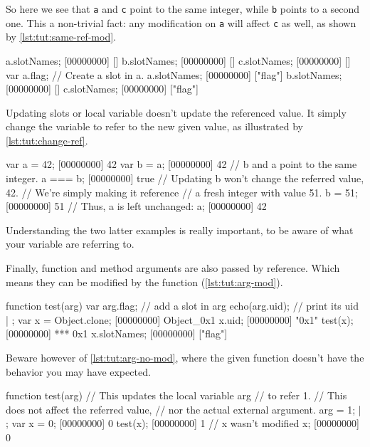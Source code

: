 So here we see that \lstinline|a| and \lstinline|c| point to the same
integer, while \lstinline|b| points to a second one. This a
non-trivial fact: any modification on \lstinline|a| will affect
\lstinline|c| as well, as shown by \autoref{lst:tut:same-ref-mod}.

\begin{urbiscript}[caption=Shared modification,
  label=lst:tut:same-ref-mod, name=same]
a.slotNames;
[00000000] []
b.slotNames;
[00000000] []
c.slotNames;
[00000000] []
var a.flag; // Create a slot in a.
a.slotNames;
[00000000] ["flag"]
b.slotNames;
[00000000] []
c.slotNames;
[00000000] ["flag"]
\end{urbiscript}

Updating slots or local variable doesn't update the referenced
value. It simply change the variable to refer to the new given value,
as illustrated by \autoref{lst:tut:change-ref}.

\begin{urbiscript}[caption=Updates just change the referee,
  label=lst:tut:change-ref]
var a = 42;
[00000000] 42
var b = a;
[00000000] 42
// b and a point to the same integer.
a === b;
[00000000] true
// Updating b won't change the referred value, 42.
// We're simply making it reference
// a fresh integer with value 51.
b = 51;
[00000000] 51
// Thus, a is left unchanged:
a;
[00000000] 42
\end{urbiscript}

Understanding the two latter examples is really important, to be aware
of what your variable are referring to.

Finally, function and method arguments are also passed by
reference. Which means they can be modified by the function
(\autoref{lst:tut:arg-mod}).

\begin{urbiscript}[caption=Function modifying its argument,
label=lst:tut:arg-mod]
function test(arg)
{
  var arg.flag;  // add a slot in arg
  echo(arg.uid); // print its uid
} | {};
var x = Object.clone;
[00000000] Object_0x1
x.uid;
[00000000] "0x1"
test(x);
[00000000] *** 0x1
x.slotNames;
[00000000] ["flag"]
\end{urbiscript}

Beware however of \autoref{lst:tut:arg-no-mod}, where the given function doesn't
have the behavior you may have expected.

\begin{urbiscript}[caption=Function failing to modify its argument,
label=lst:tut:arg-no-mod]
function test(arg)
{
  // This updates the local variable arg
  // to refer 1.
  // This does not affect the referred value,
  // nor the actual external argument.
  arg = 1;
} | {};
var x = 0;
[00000000] 0
test(x);
[00000000] 1
// x wasn't modified
x;
[00000000] 0
\end{urbiscript}

